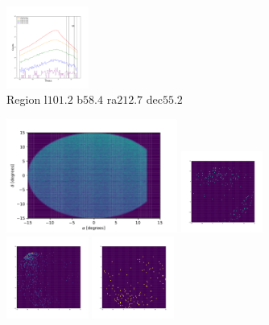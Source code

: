 \documentclass[12pt,prd]{article}
\begin{document}
\begin{figure}[h!]
\includegraphics[width=0.24\textwidth]{../figures/scanning_plotsgaiascan_l101_2_b58_4_ra212_7_dec55_2_npy_17.pdf}
\caption{Region l$101.2$ b$58.4$ ra$212.7$ dec$55.2$}
\end{figure}

\begin{figure}[h!]
\centering
\includegraphics[width=0.5\textwidth]{../figures/histogram2dgaiascan_l101_2_b58_4_ra212_7_dec55_2_npy.pdf}
\includegraphics[width=0.24\textwidth]{../figures/stars_near_zero_2dhistgaiascan_l101_2_b58_4_ra212_7_dec55_2_npy_0.pdf}
\includegraphics[width=0.24\textwidth]{../figures/stars_near_zero_2dhistgaiascan_l101_2_b58_4_ra212_7_dec55_2_npy_1.pdf}
\includegraphics[width=0.24\textwidth]{../figures/stars_near_zero_2dhistgaiascan_l101_2_b58_4_ra212_7_dec55_2_npy_2.pdf}

\end{figure}
\end{document}
